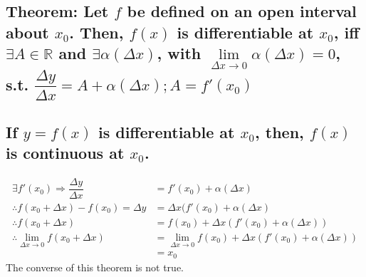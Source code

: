 \documentclass[fleqn]{article}
\begin{document}
\subsection{Theorem: Let $f$ be defined on an open interval about $x_0$. Then, $f(x)$ is differentiable at $x_0$, iff $\exists A \in \mathbb{R}$ and $\exists \alpha(\Delta x)$, with $\lim\limits_{\Delta x \rightarrow 0} \alpha(\Delta x) = 0$, s.t. $\dfrac{\Delta y}{\Delta x} = A + \alpha(\Delta x) ; A = f'(x_0)$}

\subsection{If $y = f(x)$ is differentiable at $x_0$, then, $f(x)$ is continuous at $x_0$.}

\begin{align*}
	\exists f'(x_0) \Rightarrow \dfrac{\Delta y}{\Delta x} &= f'(x_0) + \alpha(\Delta x) \\
	\therefore f(x_0 + \Delta x) - f(x_0) = \Delta y &= \Delta x (f'(x_0) + \alpha(\Delta x) \\
	\therefore f(x_0 + \Delta x) &= f(x_0) + \Delta x (f'(x_0) + \alpha(\Delta x)) \\
	\therefore \lim\limits_{\Delta x \rightarrow 0}f(x_0 + \Delta x) &= \lim\limits_{\Delta x \rightarrow 0}f(x_0) + \Delta x (f'(x_0) + \alpha(\Delta x)) \\
	&= x_0 
\end{align*}
The converse of this theorem is not true.
\end{document}
